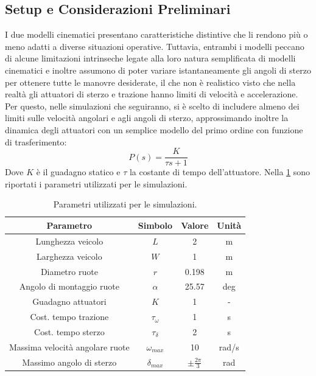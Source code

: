 \subsection{Setup e Considerazioni Preliminari}
I due modelli cinematici presentano caratteristiche distintive che li rendono più o meno adatti a diverse situazioni operative. Tuttavia, entrambi i modelli peccano di alcune limitazioni intrinseche legate alla loro natura semplificata di modelli cinematici e inoltre assumono di poter variare istantaneamente gli angoli di sterzo per ottenere tutte le manovre desiderate, il che non è realistico visto che nella realtà gli attuatori di sterzo e trazione hanno limiti di velocità e accelerazione.
Per questo, nelle simulazioni che seguiranno, si è scelto di includere almeno dei limiti sulle velocità angolari e agli angoli di sterzo, approssimando inoltre la dinamica degli attuatori con un semplice modello del primo ordine con funzione di trasferimento:
\begin{equation}\label{eq:actuator_dynamics}
    P(s) = \frac{K}{\tau s + 1}
\end{equation}
Dove $K$ è il guadagno statico e $\tau$ la costante di tempo dell'attuatore. Nella \cref{tab:simulation_parameters} sono riportati i parametri utilizzati per le simulazioni.
\begin{table}[h]
    \centering
    \begin{tabular}{|c|c|c|c|}
        \hline
        \textbf{Parametro}              & \textbf{Simbolo} & \textbf{Valore}      & \textbf{Unità} \\
        \hline
        Lunghezza veicolo               & $L$              & 2                    & m              \\
        \hline
        Larghezza veicolo               & $W$              & 1                    & m              \\
        \hline
        Diametro ruote                  & $r$              & 0.198                & m              \\
        \hline
        Angolo di montaggio ruote       & $\alpha$         & 25.57                & deg            \\
        \hline
        Guadagno attuatori              & $K$              & 1                    & -              \\
        \hline
        Cost. tempo trazione            & $\tau_\omega$    & 1                    & s              \\
        \hline
        Cost. tempo sterzo              & $\tau_\delta$    & 2                    & s              \\
        \hline
        Massima velocità angolare ruote & $\omega_{max}$   & 10                   & rad/s          \\
        \hline
        Massimo angolo di sterzo        & $\delta_{max}$   & $\pm \frac{2\pi}{3}$ & rad            \\
        \hline
    \end{tabular}
    \caption{Parametri utilizzati per le simulazioni.}
    \label{tab:simulation_parameters}
\end{table}
